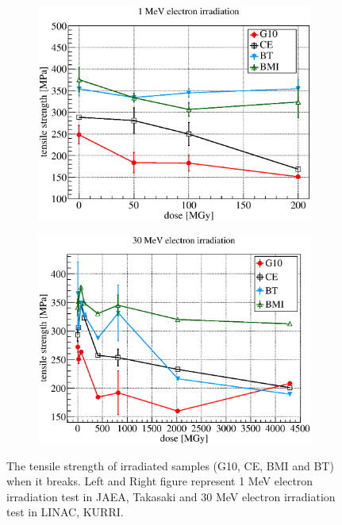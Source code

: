 \begin{figure}[H]
  \begin{subfigure}{0.3\textwidth}
   \centering
   \includegraphics[scale=0.43]{chapter4/fig/tensile_takasaki.eps}
  \end{subfigure}
  \hspace{0.2\textwidth}
  \begin{subfigure}{0.3\textwidth}
   \centering
   \includegraphics[scale=0.43]{chapter4/fig/tensile_kyoto.eps}
  \end{subfigure}
  \caption{The tensile strength of irradiated samples (G10, CE, BMI and BT) when it breaks. Left and Right figure represent 1 MeV electron irradiation test in JAEA, Takasaki and 30 MeV electron irradiation test in LINAC, KURRI.}
  \label{3resultgfrp}
 \end{figure}
